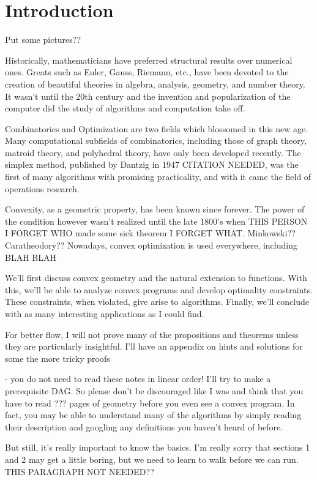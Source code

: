\documentclass{article}
\numberwithin{equation}{section}
\theoremstyle{definition}
\begin{document}
\section*{Introduction}
Put some pictures??

Historically, mathematicians have preferred structural results over numerical ones. Greats such as Euler, Gauss, Riemann, etc., have been devoted to the creation of beautiful theories in algebra, analysis, geometry, and number theory. It wasn't until the 20th century and the invention and popularization of the computer did the study of algorithms and computation take off.

Combinatorics and Optimization are two fields which blossomed in this new age. Many computational subfields of combinatorics, including those of graph theory, matroid theory, and polyhedral theory, have only been developed recently. The simplex method, published by Dantzig in 1947 CITATION NEEDED, was the first of many algorithms with promising practicality, and with it came the field of operations research.

Convexity, as a geometric property, has been known since forever. The power of the condition however wasn't realized until the late 1800's when THIS PERSON I FORGET WHO made some sick theorem I FORGET WHAT. Minkowski?? Caratheodory?? Nowadays, convex optimization is used everywhere, including BLAH BLAH

We'll first discuss convex geometry and the natural extension to functions. With this, we'll be able to analyze convex programs and develop optimality constraints. These constraints, when violated, give arise to algorithms. Finally, we'll conclude with as many interesting applications as I could find.

For better flow, I will not prove many of the propositions and theorems unless they are particularly insightful. I'll have an appendix on hints and solutions for some the more tricky proofs

- you do not need to read these notes in linear order! I'll try to make a prerequisite DAG. So please don't be discouraged like I was and think that you have to read ??? pages of geometry before you even see a convex program. In fact, you may be able to understand many of the algorithms by simply reading their description and googling any definitions you haven't heard of before.

But still, it's really important to know the basics. I'm really sorry that sections 1 and 2 may get a little boring, but we need to learn to walk before we can run.
THIS PARAGRAPH NOT NEEDED??
\newpage
\end{document}
